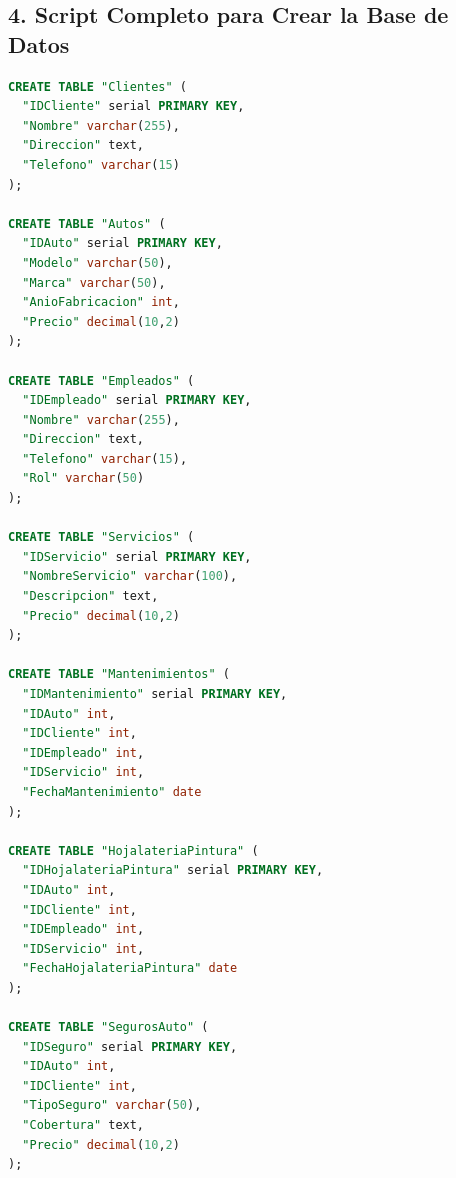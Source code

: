 \documentclass[12pt]{article}
\begin{document}
    \subsection*{4. Script Completo para Crear la Base de Datos}
    \begin{lstlisting}[language=SQL]
CREATE TABLE "Clientes" (
  "IDCliente" serial PRIMARY KEY,
  "Nombre" varchar(255),
  "Direccion" text,
  "Telefono" varchar(15)
);

CREATE TABLE "Autos" (
  "IDAuto" serial PRIMARY KEY,
  "Modelo" varchar(50),
  "Marca" varchar(50),
  "AnioFabricacion" int,
  "Precio" decimal(10,2)
);

CREATE TABLE "Empleados" (
  "IDEmpleado" serial PRIMARY KEY,
  "Nombre" varchar(255),
  "Direccion" text,
  "Telefono" varchar(15),
  "Rol" varchar(50)
);

CREATE TABLE "Servicios" (
  "IDServicio" serial PRIMARY KEY,
  "NombreServicio" varchar(100),
  "Descripcion" text,
  "Precio" decimal(10,2)
);

CREATE TABLE "Mantenimientos" (
  "IDMantenimiento" serial PRIMARY KEY,
  "IDAuto" int,
  "IDCliente" int,
  "IDEmpleado" int,
  "IDServicio" int,
  "FechaMantenimiento" date
);

CREATE TABLE "HojalateriaPintura" (
  "IDHojalateriaPintura" serial PRIMARY KEY,
  "IDAuto" int,
  "IDCliente" int,
  "IDEmpleado" int,
  "IDServicio" int,
  "FechaHojalateriaPintura" date
);

CREATE TABLE "SegurosAuto" (
  "IDSeguro" serial PRIMARY KEY,
  "IDAuto" int,
  "IDCliente" int,
  "TipoSeguro" varchar(50),
  "Cobertura" text,
  "Precio" decimal(10,2)
);
    \end{lstlisting}
\end{document}
